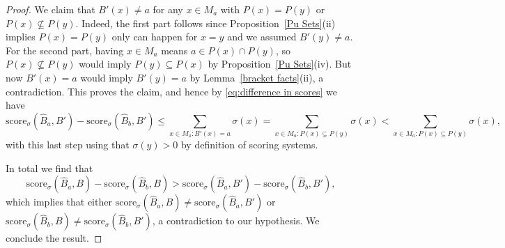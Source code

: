 \documentclass[10pt,a4paper]{amsart}
\newcommand{\score}{\mathrm{score}}
\newcommand{\sig}{\sigma}
\newcommand{\sub}{\subseteq}
\begin{document}
\begin{proof}
	We claim that $B'(x)\ne a$ for any $x\in M_a$ with $P(x)=P(y)$ or $P(x)\not\sub P(y)$.  Indeed, the first part follows since Proposition~\ref{Pu Sets}(ii) implies $P(x)=P(y)$ only can happen for $x=y$ and we assumed $B'(y)\ne a$.  For the second part, having $x\in M_a$ means $a\in P(x)\cap P(y)$, so $P(x)\not \sub P(y)$ would imply $P(y)\sub P(x)$ by Proposition~\ref{Pu Sets}(iv).  But now $B'(x)=a$ would imply $B'(y)=a$ by Lemma~\ref{bracket facts}(ii), a contradiction.  This proves the claim, and hence by \eqref{eq:difference in scores} we have 
	\[\score_\sig(\widehat{B}_a,B')-\score_\sig(\widehat{B}_b,B')\le \sum_{x\in M_a:B'(x)=a}\sig(x)= \sum_{x\in M_a: P(x)\subsetneq P(y)}\sig(x)< \sum_{x\in M_a: P(x)\sub P(y)} \sig(x),\]
	with this last step using that $\sig(y)>0$ by definition of scoring systems.
	
	In total we find that 
	\[\score_\sig(\widehat{B}_a,B)-\score_\sig(\widehat{B}_b,B)>\score_\sig(\widehat{B}_a,B')-\score_\sig(\widehat{B}_b,B'),\]
	which implies that either  $\score_\sig(\widehat{B}_a,B)\ne \score_\sig(\widehat{B}_a,B')$ or $\score_\sig(\widehat{B}_b,B)\ne \score_\sig(\widehat{B}_b,B')$, a contradiction to our hypothesis.  We conclude the result.
\end{proof}
\end{document}
